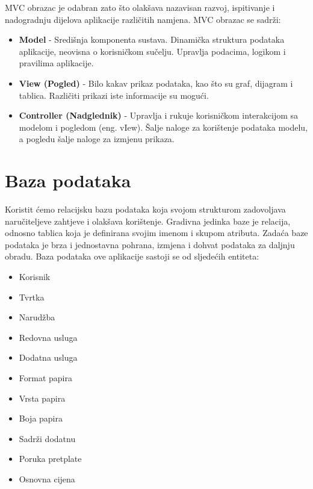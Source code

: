 	MVC obrazac je odabran zato što olakšava nazavisan razvoj, ispitivanje i nadogradnju dijelova aplikacije različitih namjena.
	MVC obrazac se sadrži:
	\begin{itemize}
		\item\textbf{Model} - Središnja komponenta sustava. Dinamička struktura podataka aplikacije, neovisna o korisničkom sučelju. Upravlja podacima, logikom i pravilima aplikacije.
		\item\textbf{View (Pogled)} - Bilo kakav prikaz podataka, kao što su graf, dijagram i tablica. Različiti prikazi iste informacije su mogući.
		\item\textbf{Controller (Nadglednik)} - Upravlja i rukuje korisničkom interakcijom sa modelom i pogledom (eng. vIew). Šalje naloge za korištenje podataka modelu, a pogledu šalje naloge za izmjenu prikaza.
	\end{itemize}

				
		\section{Baza podataka}
			
			
		
		Koristit ćemo relacijsku bazu podataka koja svojom strukturom zadovoljava naručiteljeve zahtjeve i olakšava korištenje. Gradivna jedinka baze je relacija, odnosno tablica koja je definirana svojim imenom i skupom atributa. Zadaća baze podataka je brza i jednostavna pohrana, izmjena i dohvat podataka za daljnju obradu. Baza podataka ove aplikacije sastoji se od sljedećih entiteta:
		\begin{itemize}
			\item Korisnik %
			\item Tvrtka
			\item Narudžba
			\item Redovna usluga
			\item Dodatna usluga
			\item Format papira
			\item Vrsta papira
			\item Boja papira
			\item Sadrži dodatnu
			\item Poruka pretplate
			\item Osnovna cijena
		\end{itemize}
